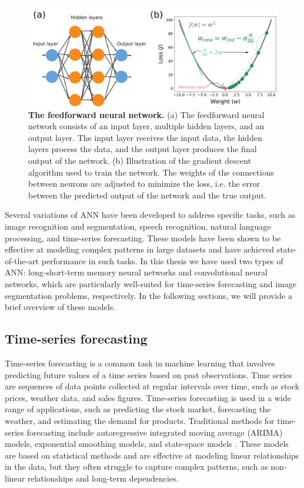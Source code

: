 \begin{figure}[H]
  \centering
  \includegraphics[width=1\textwidth]{Figures/ANN.pdf}
  \caption[The feedforward neural network]{
    \textbf{The feedforward neural network.} (a) The feedforward neural network
    consists of an input layer, multiple hidden layers, and an output layer.
    The input layer receives the input data, the hidden layers process the
    data, and the output layer produces the final output of the network.
    (b) Illustration of the gradient descent algorithm used to train the
    network. The weights of the connections between neurons are adjusted to
    minimize the loss, i.e. the error between the predicted output of the
    network and the true output.}
  \label{fig:ANN}
\end{figure}

Several variations of ANN have been developed to address specific tasks, such
as image recognition and segmentation, speech recognition, natural language
processing, and time-series forecasting. These models have been shown to be
effective at modeling complex patterns in large datasets and have achieved
state-of-the-art performance in such tasks. In this thesis we have used two
types of ANN: long-short-term memory neural networks and convolutional neural
networks, which are particularly well-suited for time-series forecasting and
image segmentation problems, respectively. In the following sections, we will
provide a brief overview of these models.

\subsection{\label{sec:Time-series forecasting} Time-series forecasting}

Time-series forecasting is a common task in machine learning that involves
predicting future values of a time series based on past observations. Time
series are sequences of data points collected at regular intervals over time,
such as stock prices, weather data, and sales figures. Time-series forecasting
is used in a wide range of applications, such as predicting the stock market,
forecasting the weather, and estimating the demand for products. Traditional
methods for time-series forecasting include autoregressive integrated moving
average (ARIMA) models, exponential smoothing models, and state-space models
\cite{Hyndman2018}. These models are based on statistical methods and are
effective at modeling linear relationships in the data, but they often struggle
to capture complex patterns, such as non-linear relationships and long-term
dependencies.

